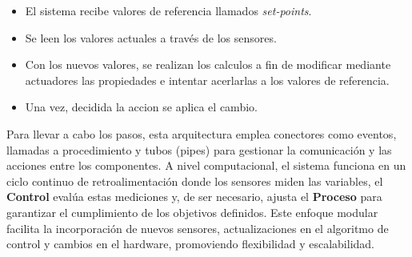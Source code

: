 \begin{itemize}
\item El sistema recibe valores de referencia llamados \textit{set-points}.
\item Se leen los valores actuales a través de los sensores.
\item Con los nuevos valores, se realizan los calculos a fin de modificar mediante actuadores las propiedades e intentar acerlarlas a los valores de referencia.
\item Una vez, decidida la accion se aplica el cambio.
\end{itemize}


Para llevar a cabo los pasos, esta arquitectura emplea conectores como eventos, llamadas a procedimiento y tubos (pipes) para gestionar la comunicación y las acciones entre los componentes. A nivel computacional, el sistema funciona en un ciclo continuo de retroalimentación donde los sensores miden las variables, el \textbf{Control} evalúa estas mediciones y, de ser necesario, ajusta el \textbf{Proceso} para garantizar el cumplimiento de los objetivos definidos. Este enfoque modular facilita la incorporación de nuevos sensores, actualizaciones en el algoritmo de control y cambios en el hardware, promoviendo flexibilidad y escalabilidad.


